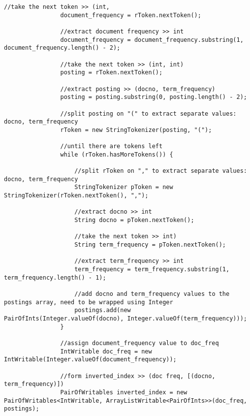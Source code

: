 \documentclass{article} %
\begin{document}
\begin{lstlisting}[style=Java]
                //take the next token >> (int,
                document_frequency = rToken.nextToken();
                
                //extract document frequency >> int 
                document_frequency = document_frequency.substring(1, document_frequency.length() - 2);
                
                //take the next token >> (int, int)
                posting = rToken.nextToken();
                
                //extract posting >> (docno, term_frequency)
                posting = posting.substring(0, posting.length() - 2);
                
                //split posting on "(" to extract separate values: docno, term_frequency
                rToken = new StringTokenizer(posting, "(");
                
                //until there are tokens left
                while (rToken.hasMoreTokens()) {
                	
                	//split rToken on "," to extract separate values: docno, term_frequency
                    StringTokenizer pToken = new StringTokenizer(rToken.nextToken(), ",");
                    
                    //extract docno >> int
                    String docno = pToken.nextToken();
                    
                    //take the next token >> int)
                    String term_frequency = pToken.nextToken();
                    
                    //extract term_frequency >> int
                    term_frequency = term_frequency.substring(1, term_frequency.length() - 1);
                    
                    //add docno and term_frequency values to the postings array, need to be wrapped using Integer
                    postings.add(new PairOfInts(Integer.valueOf(docno), Integer.valueOf(term_frequency)));
                }
                
                //assign document_frequency value to doc_freq
                IntWritable doc_freq = new IntWritable(Integer.valueOf(document_frequency));
                
                //form inverted_index >> (doc freq, [(docno, term_frequency)])
                PairOfWritables inverted_index = new PairOfWritables<IntWritable, ArrayListWritable<PairOfInts>>(doc_freq, postings);
                

\end{lstlisting}
\end{document}
